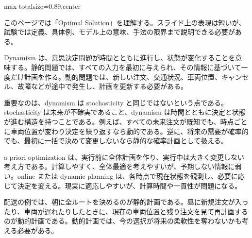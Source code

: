 \begin{minipage}[t]{0.58\textwidth}
\begin{adjustbox}{max totalsize={\textwidth}{0.89\textheight},center}
\begin{minipage}{\textwidth}\scriptsize
{}このページでは「Optimal Solution」を理解する。スライド上の表現は短いが、試験では定義、具体例、モデル上の意味、手法の限界まで説明できる必要がある。\par
Dynamism は、意思決定問題が時間とともに進行し、状態が変化することを意味する。静的問題では、すべての入力を最初に与えられ、その情報に基づいて一度だけ計画を作る。動的問題では、新しい注文、交通状況、車両位置、キャンセル、故障などが途中で発生し、計画を更新する必要がある。\par
重要なのは、dynamism は stochasticity と同じではないという点である。stochasticity は未来が不確実であること、dynamism は時間とともに決定と状態が進む構造を持つことである。例えば、すべての未来注文が既知でも、時点ごとに車両位置が変わり決定を繰り返すなら動的である。逆に、将来の需要が確率的でも、最初に一括で決めて変更しないなら静的な確率計画として扱える。\par
a priori optimization は、実行前に全体計画を作り、実行中は大きく変更しない考え方である。計算しやすく、全体最適を考えやすいが、予期しない情報に弱い。online または dynamic planning は、各時点で現在状態を観測し、必要に応じて決定を変える。現実に適応しやすいが、計算時間や一貫性が問題になる。\par
配送の例では、朝に全ルートを決めるのが静的計画である。昼に新規注文が入ったり、車両が遅れたりしたときに、現在の車両位置と残り注文を見て再計画するのが動的計画である。動的計画では、今の選択が将来の柔軟性を奪わないかも考える必要がある。\par

\end{minipage}
\end{adjustbox}
\end{minipage}
